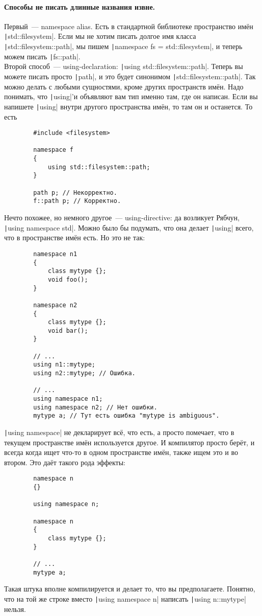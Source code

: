 \documentclass{article}
\begin{document}
    \paragraph{Способы не писать длинные названия извне.}
    Первый~--- namespace alias. Есть в стандартной библиотеке пространство имён \texttt|std::filesystem|. Если мы не хотим писать долгое имя класса\\\texttt|std::filesystem::path|, мы пишем \texttt|namespace fs = std::filesystem|, и теперь можем писать \texttt|fs::path|.\\
    Второй способ~--- using-declaration: \texttt|using std::filesystem::path|. Теперь вы можете писать просто \texttt|path|, и это будет синонимом \texttt|std::filesystem::path|. Так можно делать с любыми сущностями, кроме других пространств имён. Надо понимать, что \texttt|using|'и объявляют вам тип именно там, где он написан. Если вы напишете \texttt|using| внутри другого пространства имён, то там он и останется. То есть
    \begin{verbatim}
        #include <filesystem>

        namespace f
        {
            using std::filesystem::path;
        }

        path p; // Некорректно.
        f::path p; // Корректно.
    \end{verbatim}
    Нечто похожее, но немного другое~--- using-directive: да возликует Рябчун, \texttt|using namespace std|. Можно было бы подумать, что она делает \texttt|using| всего, что в пространстве имён есть. Но это не так:
    \begin{verbatim}
        namespace n1
        {
            class mytype {};
            void foo();
        }

        namespace n2
        {
            class mytype {};
            void bar();
        }

        // ...
        using n1::mytype;
        using n2::mytype; // Ошибка.

        // ...
        using namespace n1;
        using namespace n2; // Нет ошибки.
        mytype a; // Тут есть ошибка "mytype is ambiguous".
    \end{verbatim}
    \texttt|using namespace| не декларирует всё, что есть, а просто помечает, что в текущем пространстве имён используется другое. И компилятор просто берёт, и всегда когда ищет что-то в одном пространстве имён, также ищем это и во втором. Это даёт такого рода эффекты:
    \begin{verbatim}
        namespace n
        {}

        using namespace n;

        namespace n
        {
            class mytype {};
        }

        // ...
        mytype a;
    \end{verbatim}
    Такая штука вполне компилируется и делает то, что вы предполагаете. Понятно, что на той же строке вместо \texttt|using namespace n| написать \texttt|using n::mytype| нельзя.
\end{document}
